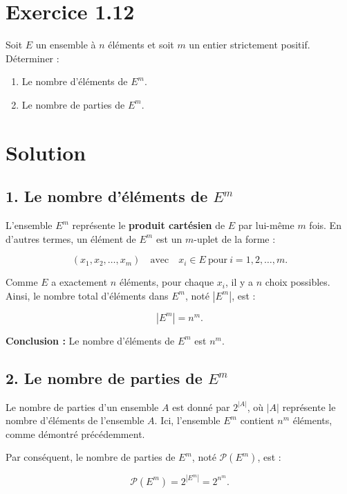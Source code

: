 \documentclass[a4paper,oneside,12pt]{amsbook}
\theoremstyle{definition}
\theoremstyle{remark}
\begin{document}
\section*{Exercice 1.12}
Soit \( E \) un ensemble à \( n \) éléments et soit \( m \) un entier strictement positif. Déterminer :

\begin{enumerate}
    \item Le nombre d'éléments de \( E^m \).
    \item Le nombre de parties de \( E^m \).
\end{enumerate}

\section*{Solution}

\subsection*{1. Le nombre d'éléments de \( E^m \)}

L'ensemble \( E^m \) représente le \textbf{produit cartésien} de \( E \) par lui-même \( m \) fois. En d'autres termes, un élément de \( E^m \) est un \( m \)-uplet de la forme :

\[
(x_1, x_2, \dots, x_m) \quad \text{avec} \quad x_i \in E \ \text{pour} \ i = 1, 2, \dots, m.
\]

Comme \( E \) a exactement \( n \) éléments, pour chaque \( x_i \), il y a \( n \) choix possibles. Ainsi, le nombre total d'éléments dans \( E^m \), noté \( |E^m| \), est :

\[
|E^m| = n^m.
\]

\textbf{Conclusion :} Le nombre d'éléments de \( E^m \) est \( n^m \).

\subsection*{2. Le nombre de parties de \( E^m \)}

Le nombre de parties d'un ensemble \( A \) est donné par \( 2^{|A|} \), où \( |A| \) représente le nombre d'éléments de l'ensemble \( A \). Ici, l'ensemble \( E^m \) contient \( n^m \) éléments, comme démontré précédemment.

Par conséquent, le nombre de parties de \( E^m \), noté \( \mathcal{P}(E^m) \), est :

\[
\mathcal{P}(E^m) = 2^{|E^m|} = 2^{n^m}.
\]
\end{document}
